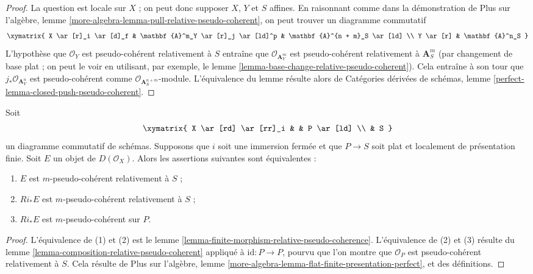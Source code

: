 \begin{proof}
La question est locale sur $X$ ; on peut donc supposer $X$, $Y$ et $S$ affines.
En raisonnant comme dans la démonstration de Plus sur l'algèbre, lemme
\ref{more-algebra-lemma-pull-relative-pseudo-coherent},
on peut trouver un diagramme commutatif
$$
\xymatrix{
X \ar[r]_i \ar[d]_f &
\mathbf{A}^m_Y \ar[r]_j \ar[ld]^p &
\mathbf{A}^{n + m}_S \ar[ld] \\
Y \ar[r] &
\mathbf{A}^n_S
}
$$
L'hypothèse que $\mathcal{O}_Y$ est pseudo-cohérent relativement à $S$
entraîne que $\mathcal{O}_{\mathbf{A}^m_Y}$ est pseudo-cohérent relativement
à $\mathbf{A}^m_S$ (par changement de base plat ; on peut le voir en utilisant,
par exemple, le lemme \ref{lemma-base-change-relative-pseudo-coherent}).
Cela entraîne à son tour que $j_*\mathcal{O}_{\mathbf{A}^n_Y}$ est
pseudo-cohérent comme
$\mathcal{O}_{\mathbf{A}^{n + m}_S}$-module. L'équivalence du
lemme résulte alors de
Catégories dérivées de schémas, lemme
\ref{perfect-lemma-closed-push-pseudo-coherent}.
\end{proof}

\begin{lemma}
\label{lemma-check-relative-pseudo-coherence-on-charts}
Soit
$$
\xymatrix{
X \ar[rd] \ar[rr]_i & & P \ar[ld] \\
& S
}
$$
un diagramme commutatif de schémas. Supposons que $i$ soit une immersion fermée
et que $P \to S$ soit plat et localement de présentation finie. Soit $E$
un objet de $D(\mathcal{O}_X)$. Alors les assertions suivantes
sont équivalentes :
\begin{enumerate}
\item $E$ est $m$-pseudo-cohérent relativement à $S$ ;
\item $Ri_*E$ est $m$-pseudo-cohérent relativement à $S$ ;
\item $Ri_*E$ est $m$-pseudo-cohérent sur $P$.
\end{enumerate}
\end{lemma}

\begin{proof}
L'équivalence de (1) et (2) est le
lemme \ref{lemma-finite-morphism-relative-pseudo-coherence}.
L'équivalence de (2) et (3) résulte du
lemme
\ref{lemma-composition-relative-pseudo-coherent}
appliqué à $\text{id} : P \to P$,
pourvu que l'on montre que $\mathcal{O}_P$ est
pseudo-cohérent relativement à $S$. Cela résulte de
Plus sur l'algèbre, lemme
\ref{more-algebra-lemma-flat-finite-presentation-perfect},
et des définitions.
\end{proof}









